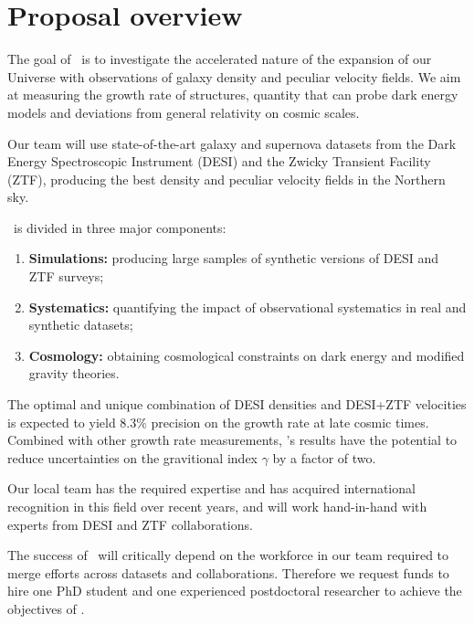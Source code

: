 \section*{Proposal overview}

The goal of  \projacro\ is to investigate the accelerated nature of 
the expansion of our Universe 
with observations of galaxy density and peculiar velocity fields. 
We aim at measuring the growth rate of structures, quantity that 
can probe dark energy 
models and deviations from general relativity on cosmic scales. 

Our team will use state-of-the-art galaxy and supernova datasets from 
the Dark Energy Spectroscopic Instrument (DESI) and 
the Zwicky Transient Facility (ZTF), producing the best density and 
peculiar velocity fields in the Northern sky. 

\projacro\ is divided in three major components:
\begin{enumerate}
  \item \textbf{Simulations:} producing large samples of synthetic versions of DESI and ZTF surveys; 
  \item \textbf{Systematics:} quantifying the impact of observational systematics in real 
  and synthetic datasets;
  \item \textbf{Cosmology:} obtaining cosmological constraints on dark energy and 
  modified gravity theories. 
\end{enumerate} 

The optimal and unique combination of DESI densities and DESI+ZTF velocities 
is expected to yield 8.3\% precision on the growth rate at late cosmic times. 
Combined with other growth rate measurements, \projacro's results have the potential 
to reduce uncertainties on the gravitional index $\gamma$ by a factor of two. 

Our local team has the required expertise and has acquired international recognition 
in this field over recent years, and will work hand-in-hand with experts from DESI and ZTF collaborations.

The success of \projacro\ will critically depend on the workforce in our team
required to merge efforts across datasets and collaborations. 
Therefore we request funds to hire one PhD student and one 
experienced postdoctoral researcher to achieve the objectives of \projacro.

